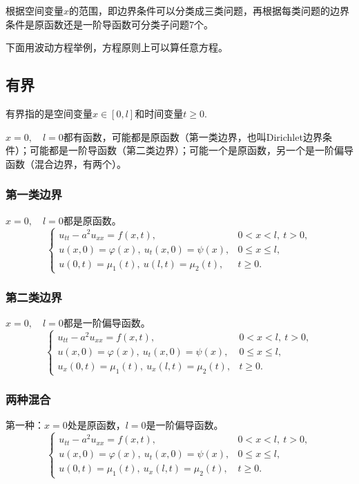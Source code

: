 \documentclass[12pt,a4paper]{article}
\numberwithin{subsection}{section}   %
\numberwithin{subsubsection}{subsection}
\theoremstyle{plain}
\theoremstyle{definition}
\theoremstyle{remark}
\theoremstyle{remark}
\begin{document}
	  根据空间变量$x$的范围，即边界条件可以分类成三类问题，再根据每类问题的边界条件是原函数还是一阶导函数可分类子问题7个。
	  
	  下面用波动方程举例，方程原则上可以算任意方程。
	\subsection{有界}
	有界指的是空间变量$x \in [0,l]$和时间变量$t \geq 0$.
	
	$x=0,\quad l=0$都有函数，可能都是原函数（第一类边界，也叫Dirichlet边界条件）；可能都是一阶导函数（第二类边界）；可能一个是原函数，另一个是一阶偏导函数（混合边界，有两个）。
	\subsubsection{第一类边界}
	$x=0,\quad l=0$都是原函数。
	\begin{equation}\label{The bounded wave equation with Dirichlet boundary conditions}
		\begin{cases}
			u_{tt} - a^2 u_{xx} = f(x, t), & 0 < x < l, \ t > 0, \\
			u(x, 0) = \varphi(x), \ u_t(x, 0) = \psi(x), & 0 \leq x \leq l, \\
			u(0, t) = \mu_1(t), \ u(l, t) = \mu_2(t), & t \geq 0.
		\end{cases}
	\end{equation}
		\subsubsection{第二类边界}
			$x=0,\quad l=0$都是一阶偏导函数。
		\begin{equation}\label{The bounded wave equation with Neumann boundary conditions}
			\begin{cases}
				u_{tt} - a^2 u_{xx} = f(x, t), & 0 < x < l, \ t > 0, \\
				u(x, 0) = \varphi(x), \ u_t(x, 0) = \psi(x), & 0 \leq x \leq l, \\
            	u_x(0, t) = \mu_1(t), \ u_x(l, t) = \mu_2(t), & t \geq 0.
			\end{cases}
		\end{equation}
		
		
		\subsubsection{两种混合}
	第一种：$x=0$处是原函数，$ l=0$是一阶偏导函数。
		\begin{equation}\label{The bounded wave equation with mixed boundary conditions_1}
			\begin{cases}
				u_{tt} - a^2 u_{xx} = f(x, t), & 0 < x < l, \ t > 0, \\
				u(x, 0) = \varphi(x), \ u_t(x, 0) = \psi(x), & 0 \leq x \leq l, \\
				u(0, t) = \mu_1(t), \ u_x(l, t) = \mu_2(t), & t \geq 0.
			\end{cases}
			\end{equation}
		
\end{document}

